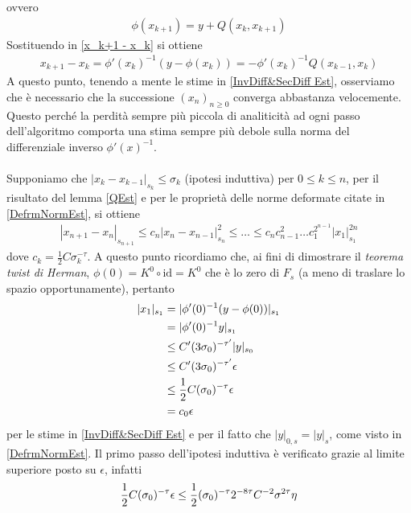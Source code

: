 \documentclass[twoside, 11pt]{amsbook}
\makeatletter
\newcommand{\0}{{(0)}}
\newcommand{\3}{{(3)}}
\theoremstyle{colonplain}
\theoremstyle{colondefinition}
\theoremstyle{colonremark}
\numberwithin{equation}{chapter}
\renewcommand{\proofname}{Dimostrazione}
\renewenvironment{proof}[1][\proofname]{\par
  \pushQED{\qed}%
  \normalfont \topsep6\p@\@plus6\p@\relax
  \trivlist
  \item[\hskip\labelsep\bfseries #1:]\ignorespaces
}{%
  \popQED\endtrivlist\@endpefalse
}
\makeatother
\begin{document}
\begin{proof}
ovvero
\begin{align}
    \phi(x_{k + 1}) = y + Q(x_k, x_{k + 1})
\end{align}
Sostituendo in \eqref{x_k+1 - x_k} si ottiene
\begin{align}
    x_{k + 1} - x_k = \phi'(x_k)^{-1}(y - \phi(x_k)) = -\phi'(x_k)^{-1}Q(x_{k - 1}, x_k)
\end{align}
A questo punto, tenendo a mente le stime in \eqref{InvDiff&SecDiff Est}, osserviamo che è necessario che la successione $(x_n)_{n \geq 0}$ converga abbastanza velocemente. Questo perché la perdità sempre più piccola di analiticità ad ogni passo dell'algoritmo comporta una stima sempre più debole sulla norma del differenziale inverso $\phi'(x)^{-1}$. \\ \\
Supponiamo che $|x_k - x_{k - 1}|_{s_k} \leq \sigma_k$ (ipotesi induttiva) per $0 \leq k \leq n$, per il risultato del lemma \ref{QEst} e per le proprietà delle norme deformate citate in \eqref{DefrmNormEst}, si ottiene
\begin{align}\label{IndHP}
    |x_{n + 1} - x_n|_{s_{n + 1}} \leq c_n|x_n - x_{n - 1}|^2_{s_n} \leq \dots \leq c_n c^2_{n - 1} \dots c^{2^{n - 1}}_1|x_1|^{2n}_{s_1}
\end{align}
dove $c_k = \frac{1}{2}C\sigma^{-\tau}_k$. A questo punto ricordiamo che, ai fini di dimostrare il \textit{teorema twist di Herman}, $\phi(0) = K^0 \circ \mathrm{id} = K^0$ che è lo zero di $F_s$ (a meno di traslare lo spazio opportunamente), pertanto
\begin{align}\label{IndFirstStep}
    |x_1|_{s_1} &= |\phi'(0)^{-1}(y - \phi(0))|_{s_1} \notag \\
    &= |\phi'(0)^{-1}y|_{s_1} \\
    &\leq C'(3\sigma_0)^{-\tau'}|y|_{s_0} \notag \\
    &\leq C'(3\sigma_0)^{-\tau'}\epsilon \notag \\
    &\leq \frac{1}{2}C(\sigma_0)^{-\tau}\epsilon \notag \\
    &= c_0\epsilon
\end{align}
per le stime in \eqref{InvDiff&SecDiff Est} e per il fatto che $|y|_{0, s} = |y|_s$, come visto in \eqref{DefrmNormEst}. Il primo passo dell'ipotesi induttiva è verificato grazie al limite superiore posto su $\epsilon$, infatti
\begin{align}
    \frac{1}{2}C(\sigma_0)^{-\tau}\epsilon &\leq \frac{1}{2}(\sigma_0)^{-\tau}2^{-8\tau}C^{-2}\sigma^{2\tau}\eta \notag \\

\end{align}
\end{proof}
\end{document}
